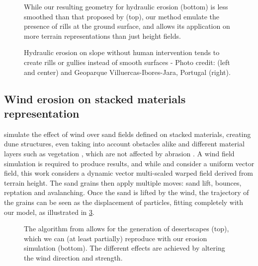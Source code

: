 \begin{figure}[H]
    \caption{While our resulting geometry for hydraulic erosion (bottom) is less smoothed than that proposed by \cite{Mei2007} (top), our method emulate the presence of rills at the ground surface, and allows its application on more terrain representations than just height fields.}
    \label{fig:erosion-screen-mei2007-1}
\end{figure}
\begin{figure}[H]
    \caption{Hydraulic erosion on slope without human intervention tends to create rills or gullies instead of smooth surfaces - Photo credit: \cite{Ren2025} (left and center) and Geoparque Villuercas-Ibores-Jara, Portugal (right).}
    \label{fig:erosion-real-world-hydraulic}
\end{figure}

\subsection{Wind erosion on stacked materials representation}

\cite{Paris2019b} simulate the effect of wind over sand fields defined on stacked materials, creating dune structures, even taking into account obstacles alike \cite{Roa2004} and different material layers such as vegetation \cite{Cordonnier2017a}, which are not affected by abrasion \cite{Paris2019b}. A wind field simulation is required to produce results, and while \cite{Roa2004} and \cite{Onoue2000} consider a uniform vector field, this work considers a dynamic vector multi-scaled warped field derived from terrain height. The sand grains then apply multiple moves: sand lift, bounces, reptation and avalanching. Once the sand is lifted by the wind, the trajectory of the grains can be seen as the displacement of particles, fitting completely with our model, as illustrated in \cref{fig:erosion-screen-paris2020}.

\begin{figure}[H]
    \caption{The algorithm from \cite{Paris2019b} allows for the generation of desertscapes (top), which we can (at least partially) reproduce with our erosion simulation (bottom). The different effects are achieved by altering the wind direction and strength.}
    \label{fig:erosion-screen-paris2020}
\end{figure}




